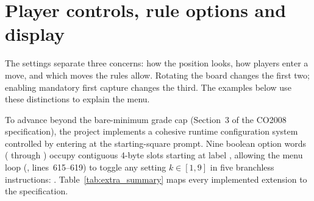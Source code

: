 \section{Player controls, rule options and display}
\label{sec:extra}

The settings separate three concerns: how the position looks, how players enter a move, and which moves the rules allow. Rotating the board changes the first two; enabling mandatory first capture changes the third. The examples below use these distinctions to explain the menu.

To advance beyond the bare-minimum grade cap (Section~3 of the CO2008 specification), the project implements a cohesive runtime configuration system controlled by entering  at the starting-square prompt. Nine boolean option words ( through ) occupy contiguous 4-byte slots starting at label , allowing the menu loop (, lines~615--619) to toggle any setting $k \in [1, 9]$ in five branchless instructions: . Table~\ref{tab:extra_summary} maps every implemented extension to the specification.


